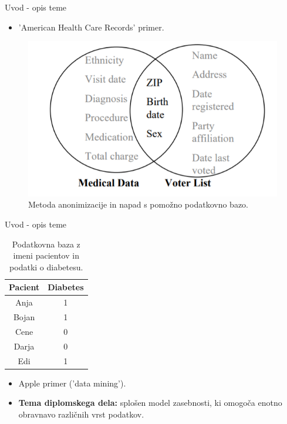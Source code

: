 \documentclass{beamer}
\begin{document}
\begin{frame}{Uvod - opis teme}

  \begin{itemize}
  \item 'American Health Care Records' primer.
  \end{itemize}
\begin{figure}
\includegraphics[width=\textwidth,height=0.5\textheight,keepaspectratio]{slika1}
\caption{Metoda anonimizacije in napad s pomožno podatkovno bazo.}
\end{figure}

\end{frame}

\begin{frame}{Uvod - opis teme}
\begin{table}
\begin{center}
 \begin{tabular}{| c | c |} 
 \hline
 \textbf{Pacient} & \textbf{Diabetes}  \\ [0.5ex] 
 \hline
 Anja & 1  \\ 
 \hline
 Bojan & 1\\
 \hline
 Cene & 0 \\
 \hline
 Darja & 0  \\
 \hline
 Edi & 1  \\  
 \hline
\end{tabular}
\caption{Podatkovna baza z imeni pacientov in podatki o diabetesu.}
\end{center}
\end{table}
  \begin{itemize}
  \item Apple primer ('data mining').
 \item \textbf{Tema diplomskega dela:} splošen model zasebnosti, ki omogoča enotno obravnavo različnih vrst podatkov.
  \end{itemize}
\end{frame}
\end{document}
